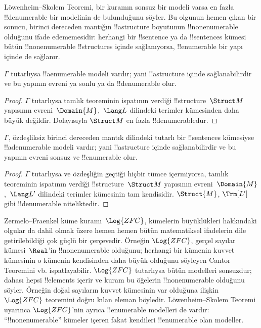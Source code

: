 


Löwenheim--Skolem Teoremi, bir kuramın sonsuz bir modeli varsa en fazla
!!{denumerable} bir modelinin de bulunduğunu söyler. Bu olgunun hemen
çıkan bir sonucu, birinci dereceden mantığın !!a{structure} boyutunun
!!{nonenumerable} olduğunu ifade edememesidir: herhangi bir !!{sentence}
ya da !!{sentence}s kümesi bütün !!{nonenumerable} !!{structure}s içinde
sağlanıyorsa, !!{enumerable} bir yapı içinde de sağlanır.

\begin{thm}
 $\Gamma$ tutarlıysa !!a{enumerable} modeli
vardır; yani !!a{structure} içinde sağlanabilirdir ve bu yapının evreni
ya sonlu ya da !!{denumerable} olur.
\end{thm}

\begin{proof}
$\Gamma$ tutarlıysa tamlık teoreminin ispatının verdiği
!!{structure}~$\Struct M$ yapısının evreni~$\Domain{M}$,~$\Lang L$
dilindeki terimler kümesinden daha büyük değildir. Dolayısıyla
$\Struct M$ en fazla !!{denumerable}{}dur.
\end{proof}

\begin{thm}
 $\Gamma$, özdeşliksiz birinci dereceden mantık
dilindeki tutarlı bir !!{sentence}s kümesiyse !!a{denumerable} modeli
vardır; yani !!a{structure} içinde sağlanabilirdir ve bu yapının evreni
sonsuz ve !!{enumerable} olur.
\end{thm}

\begin{proof}
$\Gamma$ tutarlıysa ve özdeşliğin geçtiği hiçbir tümce içermiyorsa,
tamlık teoreminin ispatının verdiği !!{structure}~$\Struct M$ yapısının
evreni~$\Domain{M}$,~$\Lang L'$ dilindeki terimler kümesinin tam
kendisidir. $\Struct{M}$, $\Trm[L']$ gibi !!{denumerable} niteliktedir.
\end{proof}

\begin{ex}
Zermelo--Fraenkel küme kuramı~$\Log{ZFC}$, kümelerin büyüklükleri
hakkındaki olgular da dahil olmak üzere hemen hemen bütün matematiksel
ifadelerin dile getirilebildiği çok güçlü bir çerçevedir. Örneğin
$\Log{ZFC}$, gerçel sayılar kümesi~$\Real$'in !!{nonenumerable}
olduğunu; herhangi bir kümenin kuvvet kümesinin o kümenin kendisinden
daha büyük olduğunu söyleyen Cantor Teoremini vb. ispatlayabilir.
$\Log{ZFC}$ tutarlıysa bütün modelleri sonsuzdur; dahası hepsi
!!{element}s içerir ve kuram bu öğelerin !!{nonenumerable} olduğunu söyler.
Örneğin doğal sayıların kuvvet kümesinin var olduğuna ilişkin
$\Log{ZFC}$ teoremini doğru kılan eleman böyledir. Löwenheim--Skolem
Teoremi uyarınca $\Log{ZFC}$'nin ayrıca !!{enumerable} modelleri de
vardır: ``!!{nonenumerable}'' kümeler içeren fakat kendileri
!!{enumerable} olan modeller.
\end{ex}

